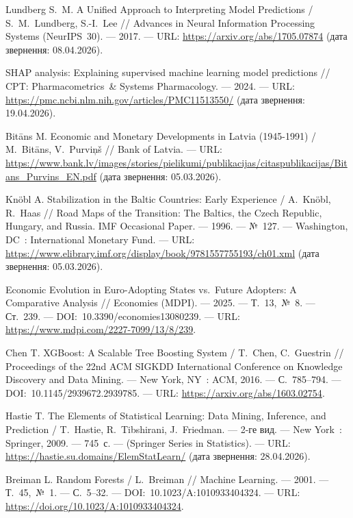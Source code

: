 \documentclass{bachelor_thesis}
\begin{document}
\begin{enumerate}[label={[\arabic*]}, leftmargin=0pt, itemindent=0pt, labelindent=0pt]
\item Lundberg S.~M. A Unified Approach to Interpreting Model Predictions / S.~M.~Lundberg, S.-I.~Lee // Advances in Neural Information Processing Systems (NeurIPS~30). --- 2017. --- URL: \url{https://arxiv.org/abs/1705.07874} (дата звернення: 08.04.2026).

\item SHAP analysis: Explaining supervised machine learning model predictions // CPT: Pharmacometrics~\& Systems Pharmacology. --- 2024. --- URL: \url{https://pmc.ncbi.nlm.nih.gov/articles/PMC11513550/} (дата звернення: 19.04.2026).

\item Bit\={a}ns M. Economic and Monetary Developments in Latvia (1945-1991) / M.~Bit\={a}ns, V.~Purvi\c{n}\v{s} // Bank of Latvia. --- URL: \url{https://www.bank.lv/images/stories/pielikumi/publikacijas/citaspublikacijas/Bitans_Purvins_EN.pdf} (дата звернення: 05.03.2026).

\item Kn\"obl A. Stabilization in the Baltic Countries: Early Experience / A.~Kn\"obl, R.~Haas // Road Maps of the Transition: The Baltics, the Czech Republic, Hungary, and Russia. IMF Occasional Paper. --- 1996. --- №~127. --- Washington, DC~: International Monetary Fund. --- URL: \url{https://www.elibrary.imf.org/display/book/9781557755193/ch01.xml} (дата звернення: 05.03.2026).

\item Economic Evolution in Euro-Adopting States vs.\ Future Adopters: A Comparative Analysis // Economies (MDPI). --- 2025. --- Т.~13,~№~8. --- Ст.~239. --- DOI:~10.3390/economies13080239. --- URL: \url{https://www.mdpi.com/2227-7099/13/8/239}.

\item Chen T. XGBoost: A Scalable Tree Boosting System / T.~Chen, C.~Guestrin // Proceedings of the 22nd ACM SIGKDD International Conference on Knowledge Discovery and Data Mining. --- New York, NY~: ACM, 2016. --- С.~785--794. --- DOI:~10.1145/2939672.2939785. --- URL: \url{https://arxiv.org/abs/1603.02754}.

\item Hastie T. The Elements of Statistical Learning: Data Mining, Inference, and Prediction / T.~Hastie, R.~Tibshirani, J.~Friedman. --- 2-ге вид. --- New York~: Springer, 2009. --- 745~с. --- (Springer Series in Statistics). --- URL: \url{https://hastie.su.domains/ElemStatLearn/} (дата звернення: 28.04.2026).

\item Breiman L. Random Forests / L.~Breiman // Machine Learning. --- 2001. --- Т.~45,~№~1. --- С.~5--32. --- DOI:~10.1023/A:1010933404324. --- URL: \url{https://doi.org/10.1023/A:1010933404324}.


\end{enumerate}
\end{document}
